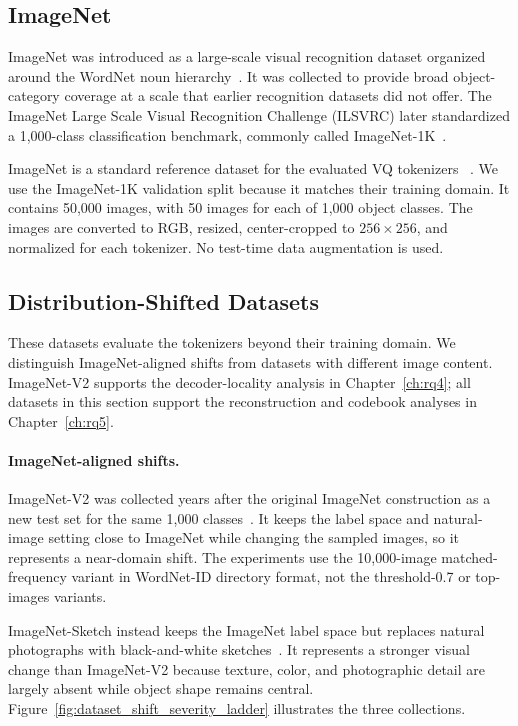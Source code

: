 \subsection{ImageNet}
\label{subsec:imagenet_validation}

ImageNet was introduced as a large-scale visual recognition dataset organized around the WordNet noun hierarchy~\cite{deng2009imagenet}. It was collected to provide broad object-category coverage at a scale that earlier recognition datasets did not offer. The ImageNet Large Scale Visual Recognition Challenge (ILSVRC) later standardized a 1,000-class classification benchmark, commonly called ImageNet-1K~\cite{russakovsky2015imagenet}.

ImageNet is a standard reference dataset for the evaluated VQ tokenizers
~\cite{esser2021taming,sun2024llamagen}. We use the ImageNet-1K validation split
because it matches their training domain. It contains 50,000 images, with 50
images for each of 1,000 object classes. The images are converted to RGB,
resized, center-cropped to $256\times256$, and normalized for each tokenizer.
No test-time data augmentation is used.

\subsection{Distribution-Shifted Datasets}
\label{subsec:shifted_datasets}

These datasets evaluate the tokenizers beyond their training domain. We
distinguish ImageNet-aligned shifts from datasets with different image content.
ImageNet-V2 supports the decoder-locality analysis in Chapter~\ref{ch:rq4}; all
datasets in this section support the reconstruction and codebook analyses in
Chapter~\ref{ch:rq5}.

\paragraph{ImageNet-aligned shifts.}
ImageNet-V2 was collected years after the original ImageNet construction as a
new test set for the same 1,000 classes~\cite{recht2019imagenet}. It keeps the
label space and natural-image setting close to ImageNet while changing the
sampled images, so it represents a near-domain shift. The experiments use the
10{,}000-image matched-frequency variant in WordNet-ID directory format, not
the threshold-0.7 or top-images variants.

ImageNet-Sketch instead keeps the ImageNet label space but replaces natural
photographs with black-and-white sketches~\cite{wang2019learning}. It represents
a stronger visual change than ImageNet-V2 because texture, color, and photographic
detail are largely absent while object shape remains central.
Figure~\ref{fig:dataset_shift_severity_ladder} illustrates the three collections.

